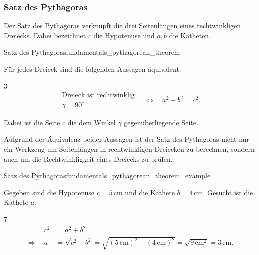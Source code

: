 \subsubsection{Satz des Pythagoras}
\label{subsubsec:fundamentals_right_triangles_pythagorean_theorem}

Der Satz des Pythagoras verknüpft die drei Seitenlängen eines rechtwinkligen
Dreiecks. Dabei bezeichnet $c$ die Hypotenuse und $a,b$ die Katheten.

\begin{TheoremBox}{Satz des Pythagoras}{fundamentals_pythagorean_theorem}
  \noindent
  \begin{minipage}[t]{0.64\linewidth}
    Für jedes Dreieck sind die folgenden Aussagen äquivalent:
    \begin{ClozeArea}[22]{3}
      \[
        \begin{gathered}
          \text{Dreieck ist rechtwinklig}\\[-0.1em]
          \gamma=90^\circ
        \end{gathered}
        \quad \Longleftrightarrow \quad
        a^2+b^2=c^2.
      \]
    \end{ClozeArea}
    Dabei ist die Seite $c$ die dem Winkel $\gamma$ gegenüberliegende Seite.
  \end{minipage}\hfill
  \begin{minipage}[t]{0.31\linewidth}
    \vspace{0pt}
    \centering
    
  \end{minipage}
\end{TheoremBox}
Aufgrund der Äquivalenz beider Aussagen ist der Satz des Pythagoras nicht nur ein Werkzeug
um Seitenlängen in rechtwinkligen Dreiecken zu berechnen, sondern auch um die
Rechtwinkligkeit eines Dreiecks zu prüfen.

\begin{ExampleBox}{Satz des Pythagoras}{fundamentals_pythagorean_theorem_example}
  \begin{minipage}[c]{0.62\linewidth}
  Gegeben sind die Hypotenuse $c=5\,\mathrm{cm}$ und die Kathete
  $b=4\,\mathrm{cm}$. Gesucht ist die Kathete $a$.
    \begin{ClozeArea}[22]{7}
      \begin{align*}
        \phantom{\Longrightarrow \quad} c^2&=a^2+b^2,\\
        \Longrightarrow \quad a&=\sqrt{c^2-b^2}=\sqrt{(5\,\mathrm{cm})^2-(4\,\mathrm{cm})^2}
         =\sqrt{9\,\mathrm{cm}^2}=3\,\mathrm{cm}.
      \end{align*}
    \end{ClozeArea}
  \end{minipage}\hfill
  \begin{minipage}[c]{0.33\linewidth}
    \centering
    
  \end{minipage}
\end{ExampleBox}
